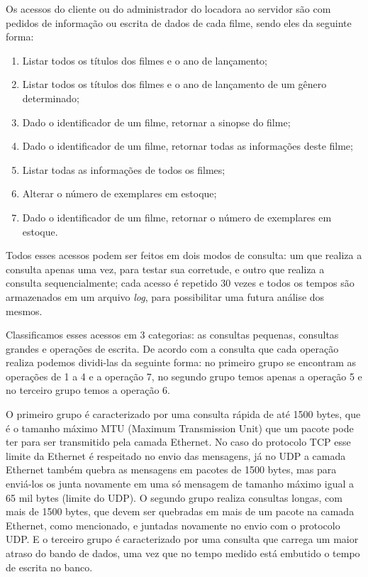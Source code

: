 \documentclass[12pt,a4paper]{article}
\newenvironment{myenumerate}{
\begin{enumerate}
 \setlength{\itemsep}{1pt}
 \setlength{\parskip}{0pt}
 \setlength{\parsep}{0pt}
}{\end{enumerate}}
\begin{document}
Os acessos do cliente ou do administrador do locadora ao servidor são com pedidos de informação ou escrita de dados de cada filme, sendo eles da seguinte forma:

\begin {myenumerate}
\item Listar todos os títulos dos filmes e o ano de lançamento;
\item Listar todos os títulos dos filmes e o ano de lançamento de um gênero determinado;
\item Dado o identificador de um filme, retornar a sinopse do filme;
\item Dado o identificador de um filme, retornar todas as informações deste filme;
\item Listar todas as informações de todos os filmes;
\item Alterar o número de exemplares em estoque;
\item Dado o identificador de um filme, retornar o número de exemplares
em estoque.
\end{myenumerate}

    Todos esses acessos podem ser feitos em dois modos de consulta: um que realiza a consulta apenas uma vez, para testar sua corretude, e outro que realiza a consulta sequencialmente; cada acesso é repetido 30 vezes e todos os tempos são armazenados em um arquivo {\it log}, para possibilitar uma futura análise dos mesmos.
    
    Classificamos esses acessos em 3 categorias: as consultas pequenas, consultas grandes e operações de escrita. De acordo com a consulta que cada operação realiza podemos dividi-las da seguinte forma: no primeiro grupo se encontram as operações de 1 a 4 e a operação 7, no segundo grupo temos apenas a operação 5 e no terceiro grupo temos a operação 6. 
    
O primeiro grupo é caracterizado por uma consulta rápida de até 1500 bytes, que é o tamanho máximo MTU (Maximum Transmission Unit) que um pacote pode ter para ser transmitido pela camada Ethernet. No caso do protocolo TCP esse limite da Ethernet é respeitado no envio das mensagens, já no UDP a camada Ethernet também quebra as mensagens em pacotes de 1500 bytes, mas para enviá-los os junta novamente em uma só mensagem de tamanho máximo igual a 65 mil bytes (limite do UDP). O segundo grupo realiza consultas longas, com mais de 1500 bytes, que devem ser quebradas em mais de um pacote na camada Ethernet, como mencionado, e juntadas novamente no envio com o protocolo UDP. E o terceiro grupo é caracterizado por uma consulta que carrega um maior atraso do bando de dados, uma vez que no tempo medido está embutido o tempo de escrita no banco.
\end{document}
